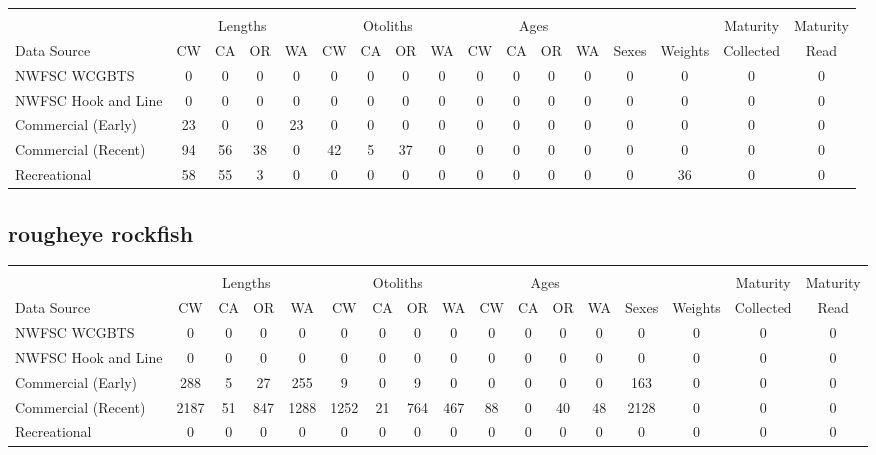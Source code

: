 \documentclass[12pt,]{article}
\begin{document}
\begin{table}[ht]
\centering
\begingroup\fontsize{10pt}{10pt}\selectfont
\begin{tabular}{|l|cccc|cccc|cccc|c|c|c|c|}
  \hline
 &  &  &  &  &  &  &  &  &  &  &  &  &  &  &  &  \\ 
   & \multicolumn{4}{c}{Lengths} &  \multicolumn{4}{c}{Otoliths} & \multicolumn{4}{c}{Ages} &  & & Maturity & Maturity\\
 Data Source & CW & CA & OR & WA & CW & CA & OR & WA & CW & CA & OR & WA & Sexes & Weights & Collected & Read\\
 \hline
NWFSC WCGBTS & 0 & 0 & 0 & 0 & 0 & 0 & 0 & 0 & 0 & 0 & 0 & 0 & 0 & 0 & 0 & 0 \\ 
  NWFSC Hook and Line & 0 & 0 & 0 & 0 & 0 & 0 & 0 & 0 & 0 & 0 & 0 & 0 & 0 & 0 & 0 & 0 \\ 
  Commercial (Early) & 23 & 0 & 0 & 23 & 0 & 0 & 0 & 0 & 0 & 0 & 0 & 0 & 0 & 0 & 0 & 0 \\ 
  Commercial (Recent) & 94 & 56 & 38 & 0 & 42 & 5 & 37 & 0 & 0 & 0 & 0 & 0 & 0 & 0 & 0 & 0 \\ 
  Recreational & 58 & 55 & 3 & 0 & 0 & 0 & 0 & 0 & 0 & 0 & 0 & 0 & 0 & 36 & 0 & 0 \\ 
   \hline
\end{tabular}
\endgroup
\end{table}

\FloatBarrier  

\newpage  

\subsection{rougheye rockfish}\label{rougheye-rockfish}

\begin{table}[ht]
\centering
\begingroup\fontsize{10pt}{10pt}\selectfont
\begin{tabular}{|l|cccc|cccc|cccc|c|c|c|c|}
  \hline
 &  &  &  &  &  &  &  &  &  &  &  &  &  &  &  &  \\ 
   & \multicolumn{4}{c}{Lengths} &  \multicolumn{4}{c}{Otoliths} & \multicolumn{4}{c}{Ages} &  & & Maturity & Maturity\\
 Data Source & CW & CA & OR & WA & CW & CA & OR & WA & CW & CA & OR & WA & Sexes & Weights & Collected & Read\\
 \hline
NWFSC WCGBTS & 0 & 0 & 0 & 0 & 0 & 0 & 0 & 0 & 0 & 0 & 0 & 0 & 0 & 0 & 0 & 0 \\ 
  NWFSC Hook and Line & 0 & 0 & 0 & 0 & 0 & 0 & 0 & 0 & 0 & 0 & 0 & 0 & 0 & 0 & 0 & 0 \\ 
  Commercial (Early) & 288 & 5 & 27 & 255 & 9 & 0 & 9 & 0 & 0 & 0 & 0 & 0 & 163 & 0 & 0 & 0 \\ 
  Commercial (Recent) & 2187 & 51 & 847 & 1288 & 1252 & 21 & 764 & 467 & 88 & 0 & 40 & 48 & 2128 & 0 & 0 & 0 \\ 
  Recreational & 0 & 0 & 0 & 0 & 0 & 0 & 0 & 0 & 0 & 0 & 0 & 0 & 0 & 0 & 0 & 0 \\ 
   \hline
\end{tabular}
\endgroup
\end{table}
\end{document}
